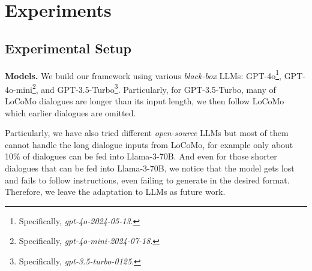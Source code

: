 \begin{table}[ht]
\small
\centering
{}
\caption{\label{gpt35_result} Experimental results of various methods based on GPT-3.5-Turbo.}
\end{table}

\section{Experiments}

\subsection{Experimental Setup} 
\noindent \textbf{Models.}
We build our framework using various \textit{black-box} LLMs: GPT-4o\footnote{Specifically, \textit{gpt-4o-2024-05-13}.}, GPT-4o-mini\footnote{Specifically, \textit{gpt-4o-mini-2024-07-18}.}, and GPT-3.5-Turbo\footnote{Specifically, \textit{gpt-3.5-turbo-0125}.}. Particularly, for GPT-3.5-Turbo, many of LoCoMo dialogues are longer than its input length, we then follow LoCoMo \cite{maharana-etal-2024-evaluating} which earlier dialogues are omitted. 

\label{sec:models}
Particularly, we have also tried different \textit{open-source} LLMs but most of them cannot handle the long dialogue inputs from LoCoMo, for example only about 10\% of dialogues can be fed into Llama-3-70B. And even for those shorter dialogues that can be fed into Llama-3-70B, we notice that the model gets lost and fails to follow instructions, even failing to generate in the desired format. Therefore, we leave the adaptation to LLMs as future work.

